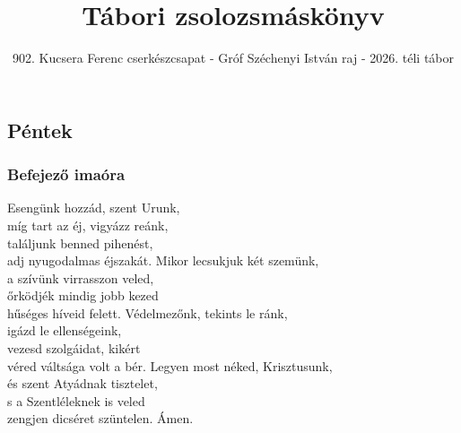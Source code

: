 \documentclass[twoside]{article}
\title{Tábori zsolozsmáskönyv}
\subtitle{902. Kucsera Ferenc cserkészcsapat - Gróf Széchenyi István raj - 2026. téli tábor}
\begin{document}
\maketitle

\subsection*{Péntek}

\subsubsection*{Befejező imaóra}







\begin{hymnstanzas}
  Esengünk hozzád, szent Urunk, \\
  míg tart az éj, vigyázz reánk, \\
  találjunk benned pihenést, \\
  adj nyugodalmas éjszakát.
\stanzabreak
  Mikor lecsukjuk két szemünk, \\
  a szívünk virrasszon veled, \\
  őrködjék mindig jobb kezed \\
  hűséges híveid felett.
\stanzabreak
  Védelmezőnk, tekints le ránk, \\
  igázd le ellenségeink, \\
  vezesd szolgáidat, kikért \\
  véred váltsága volt a bér.
\stanzabreak
  Legyen most néked, Krisztusunk, \\
  és szent Atyádnak tisztelet, \\
  s a Szentléleknek is veled \\
  zengjen dicséret szüntelen. Ámen.
\end{hymnstanzas}

\end{document}
